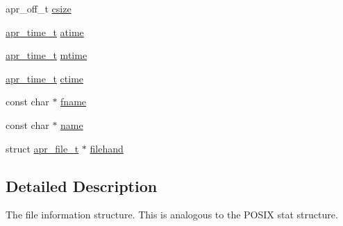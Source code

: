 \begin{DoxyCompactItemize}
apr\-\_\-off\-\_\-t \hyperlink{structapr__finfo__t_aeaa4a4def98ad4f162e05c2e2292321d}{csize}
\item 
\hyperlink{group__apr__time_gadb4bde16055748190eae190c55aa02bb}{apr\-\_\-time\-\_\-t} \hyperlink{structapr__finfo__t_ad78874e5751e9bba30debb0826eb96a7}{atime}
\item 
\hyperlink{group__apr__time_gadb4bde16055748190eae190c55aa02bb}{apr\-\_\-time\-\_\-t} \hyperlink{structapr__finfo__t_afc3bec0f6b3b10160428ba5602a41c60}{mtime}
\item 
\hyperlink{group__apr__time_gadb4bde16055748190eae190c55aa02bb}{apr\-\_\-time\-\_\-t} \hyperlink{structapr__finfo__t_aebbdb3dc755d825de3dce901cfba0883}{ctime}
\item 
const char $\ast$ \hyperlink{structapr__finfo__t_acfed83ab2943ee7a58a215aa1cfd9e47}{fname}
\item 
const char $\ast$ \hyperlink{structapr__finfo__t_a2915f9141ea76ae3672ccf9eb0fa77bb}{name}
\item 
struct \hyperlink{group__apr__file__io_gaa46e4763ac375ea3c7a43ba6f6099e22}{apr\-\_\-file\-\_\-t} $\ast$ \hyperlink{structapr__finfo__t_a7858e3d9c5f6ed062d9ff7f5c79b6336}{filehand}
\end{DoxyCompactItemize}


\subsection{Detailed Description}
The file information structure. This is analogous to the P\-O\-S\-I\-X stat structure. 


